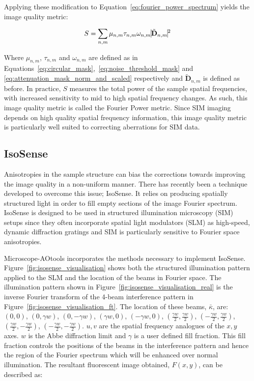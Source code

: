 Applying these modification to Equation~\ref{eq:fourier_power_spectrum} 
yields the image quality metric:

\begin{equation}\label{eq:Fourier_power_metric}
S = \sum\limits_{n,m}{\mu_{n,m}\tau_{n,m}\omega_{n,m}\vline \tilde{\textbf{D}}_{n,m} \vline^2}
\end{equation}

Where $\mu_{n,m}$, $\tau_{n,m}$ and $\omega_{n,m}$ are defined as in
Equations~\ref{eq:circular_mask},~\ref{eq:noise_threshold_mask} and
\ref{eq:attenuation_mask_norm_and_scaled} respectively and 
$\tilde{\textbf{D}}_{n,m}$ is defined as before. In practice, $S$
measures the total power of the sample spatial frequencies, with 
increased sensitivity to mid to high spatial frequency changes. As
such, this image quality metric is called the Fourier Power metric.
Since SIM imaging depends on high quality spatial frequency 
information, this image quality metric is particularly well suited 
to correcting aberrations for SIM data.

\subsection{IsoSense}
\label{subsec:isosense}

Anisotropies in the sample structure can bias the corrections
towards improving the image quality in a non-uniform manner.
There has recently been a technique developed to overcome 
this issue; IsoSense\cite{vzurauskas2019isosense}. It relies 
on producing spatially structured light in order to fill 
empty sections of the image Fourier spectrum. IsoSense is 
designed to be used in structured illumination microscopy 
(SIM) setups since they often incorporate spatial light 
modulators (SLM) as high-speed, dynamic diffraction 
gratings and SIM is particularly sensitive to Fourier
space anisotropies.

Microscope-AOtools incorporates the methods necessary to implement
IsoSense. Figure~\ref{fig:isosense_visualisation} shows both
the structured illumination pattern applied to the SLM 
and the location of the beams in Fourier space. The illumination
pattern shown in Figure~\ref{fig:isosense_visualisation_real} is
the inverse Fourier transform of the 4-beam interference pattern 
in Figure~\ref{fig:isosense_visualisation_ft}. The location 
of these beams, $\bar{\kappa}$, are: 
$(0,0)$, $(0,\gamma w)$, $(0,-\gamma w)$, $(\gamma w, 0)$, 
$(-\gamma w, 0)$, $(\frac{\gamma w}{2}, \frac{\gamma w}{2})$, 
$(-\frac{\gamma w}{2}, \frac{\gamma w}{2})$, $(\frac{\gamma w}{2},
-\frac{\gamma w}{2})$, $(-\frac{\gamma w}{2}, 
-\frac{\gamma w}{2})$. $u,v$ are the spatial frequency 
analogues of the $x,y$ axes. $w$ is the Abbe diffraction limit and 
$\gamma$ is a user defined fill fraction. This fill
fraction controls the positions of the beams in the interference
pattern and hence the region of the Fourier spectrum which will 
be enhanced over normal illumination. The resultant fluorescent image 
obtained, $F(x,y)$, can be described as:


